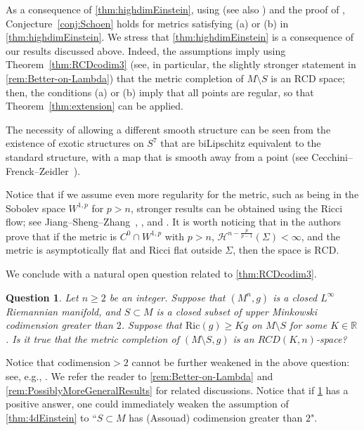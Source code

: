 \documentclass[12pt,a4paper,reqno]{amsart}
\newtheorem{question}[theorem]{Question}
\renewcommand{\geq}{\geqslant}
\begin{document}
As a consequence of \cref{thm:highdimEinstein}, using \cite[Corollary 1.3]{LeeTam} (see also \cite[Theorem 1.1]{BurkhardtGuim}) and the proof of \cite[Theorem 1.1]{LeeTam}, Conjecture~\ref{conj:Schoen} holds for metrics satisfying (a) or (b) in \cref{thm:highdimEinstein}. 
We stress that \cref{thm:highdimEinstein} is a consequence of our results discussed above. Indeed, the assumptions imply using Theorem~\ref{thm:RCDcodim3} (see, in particular, the slightly stronger statement in \cref{rem:Better-on-Lambda}) that the metric completion of $M\setminus S$ is an RCD space; then, the conditions (a) or (b) imply that all points are regular, so that Theorem~\ref{thm:extension} can be applied.

The necessity of allowing a different smooth structure can be seen from the existence of exotic structures on $S^7$ that are biLipschitz equivalent to the standard structure, with a map that is smooth away from a point (see Cecchini--Frenck--Zeidler~\cite[Theorem 2.7]{CecchiniFrenckZeidler}).

Notice that if we assume even more regularity for the metric, such as being in the Sobolev space $W^{1,p}$ for $p > n$, stronger results can be obtained using the Ricci flow; see Jiang--Sheng--Zhang~\cite{JiangShengZhang},  \cite[Theorem 1.1]{ShiTamPacific}, and \cite[Corollary 1.2]{LeeTam}. It is worth noticing that in  \cite[Theorem 4.2]{JiangShengZhang} the authors prove that if the metric is $C^0\cap W^{1,p}$ with $p>n$, $\mathcal{H}^{n-\frac{p}{p-1}}(\Sigma)<\infty$, and the metric is asymptotically flat and Ricci flat outside $\Sigma$, then the space is $\mathrm{RCD}$.
\smallskip

We conclude with a natural open question related to \cref{thm:RCDcodim3}.
\begin{question}\label{quest:RCD-if-affirmative}
    Let $n\geq 2$ be an integer. Suppose that $(M^n, g)$ is a closed $L^\infty$ Riemannian manifold, and $S\subset M$ is a closed subset of upper Minkowski codimension greater than $2$. Suppose that $\mathrm{Ric}(g) \geq Kg$ on $M\setminus S$ for some $K\in\mathbb R$. Is it true that the metric completion of $(M\setminus S, g)$ is an $RCD(K,n)$-space?
\end{question}
Notice that $\mathrm{codimension}>2$ cannot be further weakened in the above question: see, e.g., \cite[Remark 4.14]{HondaSun}. We refer the reader to \cref{rem:Better-on-Lambda} and \cref{rem:PossiblyMoreGeneralResults} for related discussions. Notice that if \cref{quest:RCD-if-affirmative} has a positive answer, one could immediately weaken the assumption of \cref{thm:4dEinstein} to ``$S\subset M$ has (Assouad) codimension greater than $2$". 
\smallskip
\end{document}
